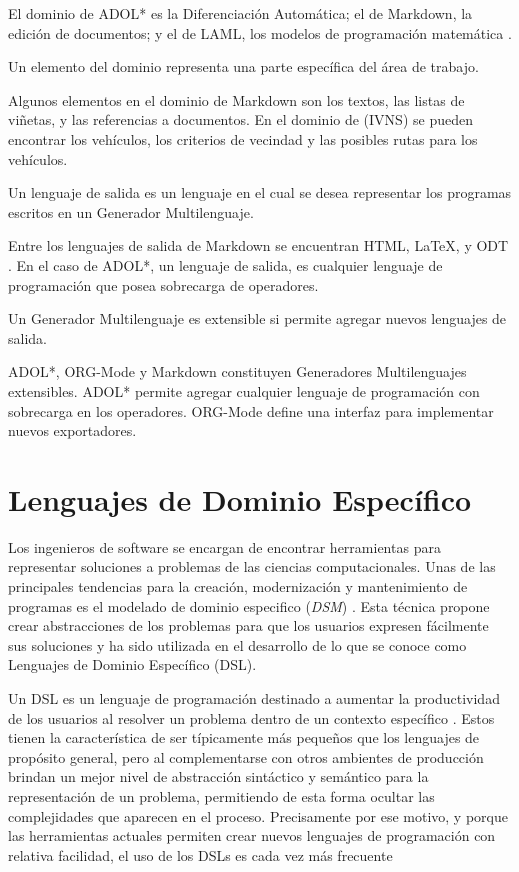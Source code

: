 El dominio de ADOL* es la Diferenciación Automática; el de Markdown, la edición de documentos; y el de LAML, los modelos de programación matemática \cite{hoyos}. 

\begin{definition}
	Un elemento del dominio representa una parte específica del área de trabajo.
\end{definition}

Algunos elementos en el dominio de Markdown son los textos, las listas de viñetas, y las referencias a documentos. En el dominio de (IVNS) se pueden encontrar los vehículos, los criterios de vecindad y las posibles rutas para los vehículos.

\begin{definition}
 Un lenguaje de salida es un lenguaje en el cual se desea representar los programas escritos en un Generador Multilenguaje.
\end{definition}

Entre los lenguajes de salida de Markdown se encuentran HTML, LaTeX, y ODT \cite{ODT}. En el caso de ADOL*, un lenguaje de salida, es cualquier lenguaje de programación que posea sobrecarga de operadores.   
 \begin{definition}
 Un Generador Multilenguaje es extensible si permite agregar nuevos lenguajes de salida.
 \end{definition}

 ADOL*, ORG-Mode y Markdown constituyen Generadores Multilenguajes extensibles. ADOL* permite agregar cualquier lenguaje de programación con sobrecarga en los operadores. ORG-Mode define una interfaz para implementar nuevos exportadores.


\section{Lenguajes de Dominio Específico}
Los ingenieros de software se encargan de encontrar herramientas para representar soluciones a problemas de las ciencias computacionales. Unas de las principales tendencias para la creación, modernización y mantenimiento de programas es el modelado de dominio especifico (\emph{DSM}) \cite{DSM}. Esta técnica propone crear abstracciones de los problemas para que los usuarios expresen fácilmente sus soluciones y ha sido utilizada en el desarrollo de lo que se conoce como Lenguajes de Dominio Específico (DSL). 

Un DSL es un lenguaje de programación destinado a aumentar la productividad de los usuarios al resolver un problema dentro de un contexto específico \cite{implementations_DSL}. Estos tienen la característica de ser típicamente más pequeños que los lenguajes de propósito general, pero al complementarse con otros ambientes de producción brindan un mejor nivel de abstracción sintáctico y semántico para la representación de un problema, permitiendo de esta forma ocultar las complejidades que aparecen en el proceso. Precisamente por ese motivo, y porque las herramientas actuales permiten crear nuevos lenguajes de programación con relativa facilidad, el uso de los DSLs es cada vez más frecuente \cite{dsl1}

